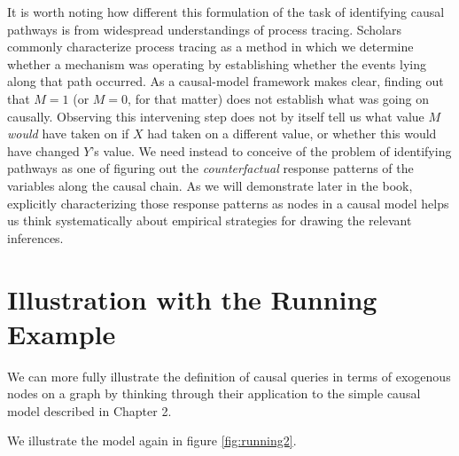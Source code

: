 \documentclass[12pt,]{book}
\begin{document}
It is worth noting how different this formulation of the task of identifying causal pathways is from widespread understandings of process tracing. Scholars commonly characterize process tracing as a method in which we determine whether a mechanism was operating by establishing whether the events lying along that path occurred. As a causal-model framework makes clear, finding out that \(M=1\) (or \(M=0\), for that matter) does not establish what was going on causally. Observing this intervening step does not by itself tell us what value \(M\) \emph{would} have taken on if \(X\) had taken on a different value, or whether this would have changed \(Y\)'s value. We need instead to conceive of the problem of identifying pathways as one of figuring out the \emph{counterfactual} response patterns of the variables along the causal chain. As we will demonstrate later in the book, explicitly characterizing those response patterns as nodes in a causal model helps us think systematically about empirical strategies for drawing the relevant inferences.

\hypertarget{illustration-with-the-running-example}{%
\section{Illustration with the Running Example}\label{illustration-with-the-running-example}}

We can more fully illustrate the definition of causal queries in terms of exogenous nodes on a graph by thinking through their application to the simple causal model described in Chapter 2.

We illustrate the model again in figure \ref{fig:running2}.
\end{document}
